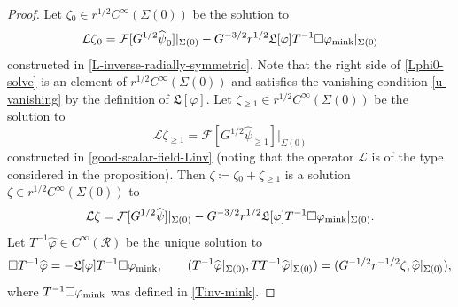\documentclass[10pt, reqno]{amsart}
\begin{document}
\begin{proof}
Let \(\zeta{}_0\in r^{1/2}C^\infty(\Sigma(0))\) be the solution to
\begin{equation}\label{Lphi0-solve}
\mathcal{L}\zeta{}_0 = \mathcal{F}[G^{1/2}\widehat{\psi{}}_0]|_{\Sigma{}(0)} - G^{-3/2}r^{1/2}\mathfrak{L}[\varphi{}]T^{-1}\Box{}\varphi{}_{\textnormal{mink}}|_{\Sigma{}(0)}
\end{equation}
constructed in \cref{L-inverse-radially-symmetric}. Note that the right
side of \cref{Lphi0-solve} is an element of \(r^{1/2}C^\infty(\Sigma{}(0))\) and satisfies the
vanishing condition \cref{u-vanishing} by the definition of \(\mathfrak{L}[\varphi{}]\).
Let \(\zeta{}_{\ge 1}\in r^{1/2}C^\infty(\Sigma{}(0))\) be the solution to
\begin{equation}
\mathcal{L}\zeta{}_{\ge 1} = \mathcal{F}[G^{1/2}\widehat{\psi{}}_{\ge 1}]|_{\Sigma{}(0)}
\end{equation}
constructed in \cref{good-scalar-field-Linv} (noting that the operator
\(\mathcal{L}\) is of the type considered in the proposition). Then \(\zeta{}\coloneqq{}\zeta{}_0 +
\zeta{}_{\ge 1}\) is a solution \(\zeta{}\in r^{1/2}C^\infty(\Sigma{}(0))\) to
\begin{equation}\label{Tinv-phi-prep-0}
\mathcal{L}\zeta{} = \mathcal{F}[G^{1/2}\widehat{\psi{}}]|_{\Sigma{}(0)} - G^{-3/2}r^{1/2}\mathfrak{L}[\varphi{}]T^{-1}\Box{}\varphi{}_{\textnormal{mink}}|_{\Sigma{}(0)}.
\end{equation}
Let \(T^{-1}\widehat{\varphi{}}\in C^\infty(\mathcal{R})\) be the unique solution to
\begin{equation}\label{Tinv-phi-prep}
\Box{}T^{-1}\widehat{\varphi{}} = -\mathfrak{L}[\varphi{}]T^{-1}\Box{}\varphi{}_{\textnormal{mink}},\qquad (T^{-1}\widehat{\varphi{}}|_{\Sigma{}(0)},TT^{-1}\widehat{\varphi{}}|_{\Sigma{}(0)}) = (G^{-1/2}r^{-1/2}\zeta{},\widehat{\varphi{}}|_{\Sigma{}(0)}),
\end{equation}
where \(T^{-1}\Box{}\varphi{}_{\textnormal{mink}}\) was defined in \cref{Tinv-mink}.


\end{proof}
\end{document}
